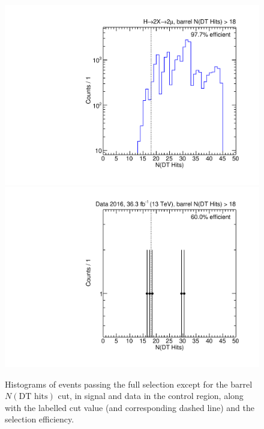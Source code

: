 \begin{figure}[p]
  \centering
  \includegraphics[width=\DSquareWidth]{figures/displaced/NM1_2Mu2J_nDTHits.pdf}
  \hspace*{-2em}
  \includegraphics[width=\DSquareWidth]{figures/displaced/NM1_Data_nDTHits.pdf}
  \caption[Histograms of events passing the full selection except for the barrel $N(\text{DT hits})$ cut in \twoMu signal and data.]{Histograms of events passing the full selection except for the barrel $N(\text{DT hits})$ cut, in  \twoMu signal and  data in the control region, along with the labelled cut value (and corresponding dashed line) and the selection efficiency.}
  \label{fig:dd:NM1_nDTHits}
\end{figure}

